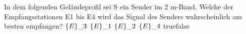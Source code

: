     {In dem folgenden Geländeprofil sei S ein Sender im 2 m-Band. Welche der Empfangsstationen E1 bis E4 wird das Signal des Senders wahrscheinlich am besten empfangen?}
    {$\text\{E\}\_3$}
    {$\text\{E\}\_1$}
    {$\text\{E\}\_2$}
    {$\text\{E\}\_4$}
    {true}{false}